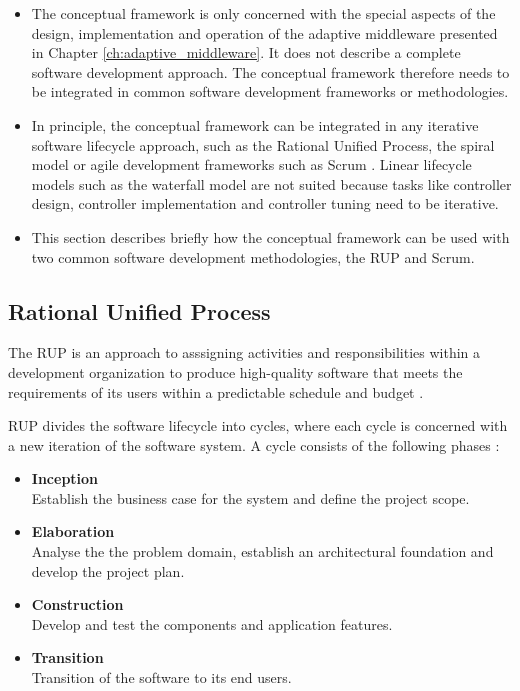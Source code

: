 \begin{itemize}
	\item The conceptual framework is only concerned with the special aspects of the design, implementation and operation of the adaptive middleware presented in Chapter \ref{ch:adaptive_middleware}. It does not describe a complete software development approach. The conceptual framework therefore needs to be integrated in common software development frameworks or methodologies.
	\item In principle, the conceptual framework can be integrated in any iterative software lifecycle approach, such as the Rational Unified Process, the spiral model \citep{Boehm:1988cd} or agile development frameworks such as Scrum \citep{Schwaber:2013aa}. Linear lifecycle models such as the waterfall model \citep{Royce:1987tl} are not suited because tasks like controller design, controller implementation and controller tuning need to be iterative.
	\item This section describes briefly how the conceptual framework can be used with two common software development methodologies, the \ac{RUP} and Scrum.
\end{itemize}

\subsection{Rational Unified Process}
The \acf{RUP} is an approach to asssigning activities and responsibilities within a development organization to produce high-quality software that meets the requirements of its users within a predictable schedule and budget \citep{Rational:2001aa}.

\ac{RUP} divides the software lifecycle into cycles, where each cycle is concerned with a new iteration of the software system. A cycle consists of the following phases \citep{Kruchten:1996aa}:

\begin{itemize}
	\item \textbf{Inception}\\
	Establish the business case for the system and define the project scope.
	\item \textbf{Elaboration}\\
	Analyse the the problem domain, establish an architectural foundation and develop the project plan.
	\item \textbf{Construction}\\
	Develop and test the components and application features.
	\item \textbf{Transition}\\
	Transition of the software to its end users.
\end{itemize}

